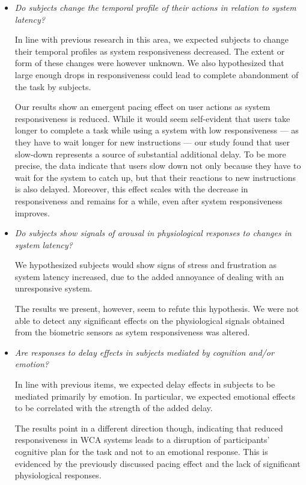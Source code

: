 \begin{itemize}
  \item \emph{Do subjects change the temporal profile of their actions in relation to system latency?}

  In line with previous research in this area, we expected subjects to change their temporal profiles as system responsiveness decreased.
  The extent or form of these changes were however unknown.
  We also hypothesized that large enough drops in responsiveness could lead to complete abandonment of the task by subjects.

  Our results show an emergent pacing effect on user actions as system responsiveness is reduced.
  While it would seem self-evident that users take longer to complete a task while using a system with low responsiveness --- as they have to wait longer for new instructions --- our study found that user slow-down represents a source of substantial additional delay.
  To be more precise, the data indicate that users slow down not only because they have to wait for the system to catch up, but that their reactions to new instructions is also delayed.
  Moreover, this effect scales with the decrease in responsiveness and remains for a while, even after system responsiveness improves.
  
  \item \emph{Do subjects show signals of arousal in physiological responses to changes in system latency?}
  
  We hypothesized subjects would show signs of stress and frustration as system latency increased, due to the added annoyance of dealing with an unresponsive system.

  The results we present, however, seem to refute this hypothesis. 
  We were not able to detect any significant effects on the physiological signals obtained from the biometric sensors as sytem responsiveness was altered.
  
  \item \emph{Are responses to delay effects in subjects mediated by cognition and/or emotion?}
  
  In line with previous items, we expected delay effects in subjects to be mediated primarily by emotion.
  In particular, we expected emotional effects to be correlated with the strength of the added delay.

  The results point in a different direction though, indicating that reduced responsiveness in WCA systems leads to a disruption of participants' cognitive plan for the task and not to an emotional response.
  This is evidenced by the previously discussed pacing effect and the lack of significant physiological responses.


\end{itemize}
